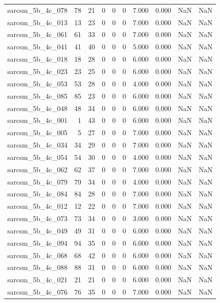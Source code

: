 \documentclass{article}
\begin{document}
\begin{longtable}{lrrrrrrrrr}
sarcsm\_5b\_4c\_078 & 78 & 21 & 0 & 0 & 0 & 7.000 & 0.000 & NaN & NaN \\
sarcsm\_5b\_4c\_013 & 13 & 23 & 0 & 0 & 0 & 7.000 & 0.000 & NaN & NaN \\
sarcsm\_5b\_4c\_061 & 61 & 33 & 0 & 0 & 0 & 7.000 & 0.000 & NaN & NaN \\
sarcsm\_5b\_4c\_041 & 41 & 40 & 0 & 0 & 0 & 5.000 & 0.000 & NaN & NaN \\
sarcsm\_5b\_4c\_018 & 18 & 28 & 0 & 0 & 0 & 6.000 & 0.000 & NaN & NaN \\
sarcsm\_5b\_4c\_023 & 23 & 25 & 0 & 0 & 0 & 6.000 & 0.000 & NaN & NaN \\
sarcsm\_5b\_4c\_053 & 53 & 28 & 0 & 0 & 0 & 4.000 & 0.000 & NaN & NaN \\
sarcsm\_5b\_4c\_085 & 85 & 23 & 0 & 0 & 0 & 6.000 & 0.000 & NaN & NaN \\
sarcsm\_5b\_4c\_048 & 48 & 34 & 0 & 0 & 0 & 6.000 & 0.000 & NaN & NaN \\
sarcsm\_5b\_4c\_001 & 1 & 43 & 0 & 0 & 0 & 6.000 & 0.000 & NaN & NaN \\
sarcsm\_5b\_4c\_005 & 5 & 27 & 0 & 0 & 0 & 7.000 & 0.000 & NaN & NaN \\
sarcsm\_5b\_4c\_034 & 34 & 29 & 0 & 0 & 0 & 7.000 & 0.000 & NaN & NaN \\
sarcsm\_5b\_4c\_054 & 54 & 30 & 0 & 0 & 0 & 4.000 & 0.000 & NaN & NaN \\
sarcsm\_5b\_4c\_062 & 62 & 37 & 0 & 0 & 0 & 7.000 & 0.000 & NaN & NaN \\
sarcsm\_5b\_4c\_079 & 79 & 34 & 0 & 0 & 0 & 4.000 & 0.000 & NaN & NaN \\
sarcsm\_5b\_4c\_084 & 84 & 28 & 0 & 0 & 0 & 7.000 & 0.000 & NaN & NaN \\
sarcsm\_5b\_4c\_012 & 12 & 22 & 0 & 0 & 0 & 7.000 & 0.000 & NaN & NaN \\
sarcsm\_5b\_4c\_073 & 73 & 34 & 0 & 0 & 0 & 3.000 & 0.000 & NaN & NaN \\
sarcsm\_5b\_4c\_049 & 49 & 31 & 0 & 0 & 0 & 6.000 & 0.000 & NaN & NaN \\
sarcsm\_5b\_4c\_094 & 94 & 35 & 0 & 0 & 0 & 6.000 & 0.000 & NaN & NaN \\
sarcsm\_5b\_4c\_068 & 68 & 42 & 0 & 0 & 0 & 6.000 & 0.000 & NaN & NaN \\
sarcsm\_5b\_4c\_088 & 88 & 31 & 0 & 0 & 0 & 6.000 & 0.000 & NaN & NaN \\
sarcsm\_5b\_4c\_021 & 21 & 21 & 0 & 0 & 0 & 6.000 & 0.000 & NaN & NaN \\
sarcsm\_5b\_4c\_076 & 76 & 35 & 0 & 0 & 0 & 7.000 & 0.000 & NaN & NaN \\

\end{longtable}
\end{document}
